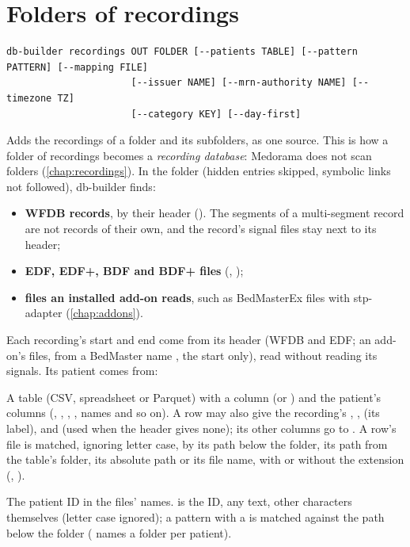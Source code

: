 \section{Folders of recordings}
\label{sec:importing-recordings}

\begin{lstlisting}[style=signature]
db-builder recordings OUT FOLDER [--patients TABLE] [--pattern PATTERN] [--mapping FILE]
                      [--issuer NAME] [--mrn-authority NAME] [--timezone TZ]
                      [--category KEY] [--day-first]
\end{lstlisting}
Adds the recordings of a folder and its subfolders, as one source. This is how a folder of
recordings becomes a \emph{recording database}: Medorama does not scan folders
(\cref{chap:recordings}). In the folder (hidden entries skipped, symbolic links not followed),
db-builder finds:
\begin{itemize}
\item \textbf{WFDB records}, by their header (). The segments of a multi-segment
  record are not records of their own, and the record's signal files stay next to its header;
\item \textbf{EDF, EDF+, BDF and BDF+ files} (, );
\item \textbf{files an installed add-on reads}, such as BedMasterEx  files with
  stp-adapter (\cref{chap:addons}).
\end{itemize}
Each recording's start and end come from its header (WFDB and EDF; an add-on's files, from a
BedMaster name , the start only), read without reading its signals.
Its patient comes from:
\begin{params}
\item[--patients TABLE] A table (CSV, spreadsheet or Parquet) with a  column (or
  ) and the patient's columns (,
  , , , names and so on). A row may also
  give the recording's , ,  (its label),
   and  (used when the header gives none); its other columns go to
  . A row's file is matched, ignoring letter case, by its path below the folder, its
  path from the table's folder, its absolute path or its file name, with or without the extension
  (, ).
\item[--pattern PATTERN] The patient ID in the files' names.  is the ID,
  \code{*} any text, other characters themselves (letter case ignored); a pattern with a
  \code{/} is matched against the path below the folder ( names a folder per
  patient).
\end{params}
